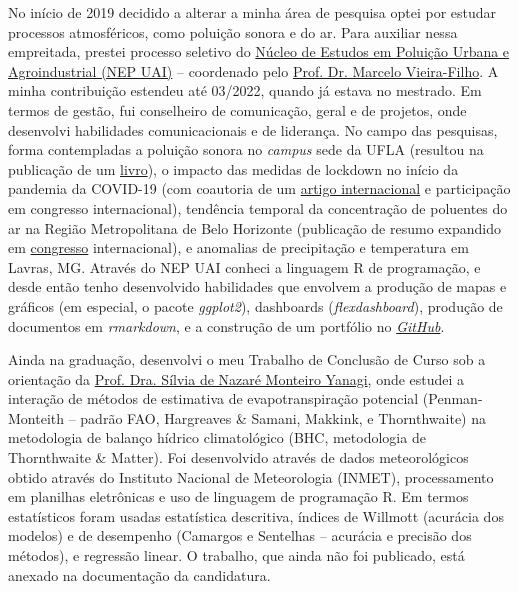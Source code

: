 \documentclass[12pt,a4paper]{article}
\begin{document}
	No início de 2019 decidido a alterar a minha área de pesquisa optei por estudar processos atmosféricos, como poluição sonora e do ar. Para auxiliar nessa empreitada, prestei processo seletivo do \href{https://sites.google.com/ufla.br/nepuai?pli=1}{Núcleo de Estudos em Poluição Urbana e Agroindustrial (NEP UAI)} – coordenado pelo \href{http://lattes.cnpq.br/5059318976988668}{Prof. Dr. Marcelo Vieira-Filho}. A minha contribuição estendeu até 03/2022, quando já estava no mestrado. Em termos de gestão, fui conselheiro de comunicação, geral e de projetos, onde desenvolvi habilidades comunicacionais e de liderança. No campo das pesquisas, forma contempladas a poluição sonora no \textit{campus} sede da UFLA (resultou na publicação de um \href{https://sites.google.com/ufla.br/nepuai/publica%C3%A7%C3%B5es/livros?authuser=0}{livro}), o impacto das medidas de lockdown no início da pandemia da COVID-19 (com coautoria de um \href{https://link.springer.com/article/10.1007/s11869-020-00959-8}{artigo internacional} e participação em congresso internacional), tendência temporal da concentração de poluentes do ar na Região Metropolitana de Belo Horizonte (publicação de resumo expandido em  \href{https://www.inicepg.univap.br/cd/INIC_2021/anais/arquivos/RE_0771_0575_01.pdf}{congresso} internacional), e anomalias de precipitação e temperatura em Lavras, MG. Através do NEP UAI conheci a linguagem R de programação, e desde então tenho desenvolvido habilidades que envolvem a produção de mapas e gráficos (em especial, o pacote \textit{ggplot2}), dashboards (\textit{flexdashboard}), produção de documentos em \textit{rmarkdown}, e a construção de um portfólio no \href{https://arthurboari.github.io/arthurboari/}{\textit{GitHub}}.
	
	Ainda na graduação, desenvolvi o meu Trabalho de Conclusão de Curso sob a orientação da \href{http://lattes.cnpq.br/3943657653311716}{Prof. Dra. Sílvia de Nazaré Monteiro Yanagi}, onde estudei a interação de métodos de estimativa de evapotranspiração potencial (Penman-Monteith – padrão FAO, Hargreaves \& Samani, Makkink, e Thornthwaite) na metodologia de balanço hídrico climatológico (BHC, metodologia de Thornthwaite \& Matter). Foi desenvolvido através de dados meteorológicos obtido através do Instituto Nacional de Meteorologia (INMET), processamento em planilhas eletrônicas e uso de linguagem de programação R. Em termos estatísticos foram usadas estatística descritiva, índices de Willmott (acurácia dos modelos) e de desempenho (Camargos e Sentelhas – acurácia e precisão dos métodos), e regressão linear. O trabalho, que ainda não foi publicado, está anexado na documentação da candidatura.
	
\end{document}
